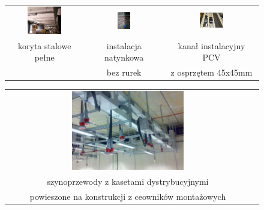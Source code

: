 \begin{figure}[ht!]
\begin{center}\begin{tabular}{ccc}
\includegraphics[trim={0 14cm 0 0},clip,width=0.47\textwidth]{elektryka/OrganizedElectricalWiring.jpg} & %
\includegraphics[trim={6cm 0 2cm 0},clip,width=0.176\textwidth]{elektryka/IMG_20210731_145157.jpg} &
\includegraphics[trim={10cm 0 50cm 0},clip,width=0.263\textwidth]{elektryka/Cabtray_03.jpg} %
\\
koryta stalowe pełne &
instalacja natynkowa &
kanał instalacyjny PCV
\\
&
bez rurek &
z osprzętem 45x45mm
\end{tabular}\end{center}

\begin{center}\begin{tabular}{cc}
\includegraphics[width=0.47\textwidth]{elektryka/szynoprzewody.jpg} &
\\
szynoprzewody z kasetami dystrybucyjnymi &
\\
powieszone na konstrukcji z ceowników montażowych &
\end{tabular}\end{center}
\end{figure}

